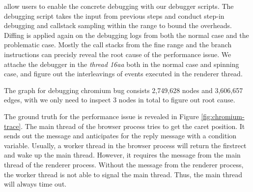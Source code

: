 \xxx allow users to enable the concrete debugging with our debugger scripts.
The debugging script takes the input from previous steps and conduct step-in debugging and callstack sampling
within the range to bound the overheads.
Diffing is applied again on the debugging logs from both the normal case and the problematic case.
Mostly the call stacks from the fine range and the branch instructions can precisly
reveal the root cause of the performance issue.
We attache the debugger in the \textit{thread 16aa} both in the normal case and spinning case,
and figure out the interleavings of events executed in the renderer thread.

The graph for debugging chromium bug consists 2,749,628 nodes and 3,606,657 edges,
with \xxx we only need to inspect 3 nodes in total to figure out root cause.

The ground truth for the performance issue is revealed in Figure \ref{fig:chromium-trace}.
The main thread of the browser process tries to get the caret position.
It sends out the message and anticipates for the reply message with a condition variable.
Usually, a worker thread in the browser process will return the firstrect and wake up the main thread.
However, it requires the message from the main thread of the renderer process.
Without the message from the renderer process, the worker thread is not able to signal the main thread.
Thus, the main thread will always time out.

\fi
